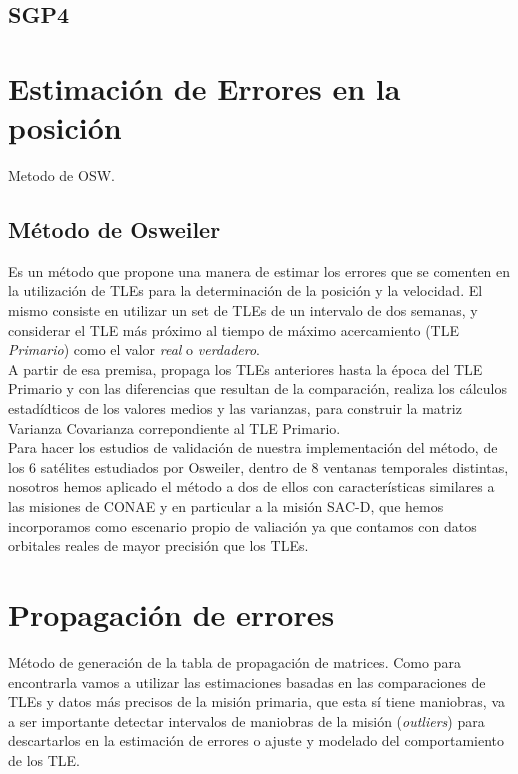 \subsection*{SGP4}{\label{subsec:sgp4model}}

\section{Estimaci\'on de Errores en la posici\'on}
Metodo de OSW.
\subsection{M\'etodo de Osweiler}
Es un m\'etodo que propone una manera de estimar los errores que se comenten en la utilizaci\'on de TLEs para la determinaci\'on de la posici\'on y la velocidad.
 El mismo consiste en utilizar un set de TLEs de un intervalo de dos semanas, y considerar el TLE m\'as pr\'oximo al tiempo de m\'aximo acercamiento (TLE  {\it{Primario}}) como el valor {\it{real}} o {\it{verdadero}}.\\
 A partir de esa premisa, propaga los TLEs anteriores hasta la \'epoca del TLE Primario y con las diferencias que resultan de la comparaci\'on, realiza los c\'alculos estad\'idticos de los valores medios y las varianzas, para construir la matriz Varianza Covarianza correpondiente al TLE Primario.\\
 Para hacer los estudios de validaci\'on de nuestra implementaci\'on del m\'etodo, de los 6 sat\'elites estudiados por Osweiler, dentro de 8 ventanas temporales distintas, nosotros hemos aplicado el m\'etodo a dos de ellos con caracter\'isticas similares a las misiones de CONAE y en particular a la misi\'on SAC-D, que hemos incorporamos como escenario propio de valiaci\'on ya que contamos con datos orbitales reales de mayor precisi\'on que los TLEs.

 \section{Propagaci\'on de errores}\label{sec:properrores}
 M\'etodo de generaci\'on de la tabla de propagaci\'on de matrices. 
 Como para encontrarla vamos a utilizar las estimaciones basadas en las comparaciones de TLEs y datos m\'as precisos de la misi\'on primaria, que esta s\'i tiene maniobras, va a ser importante detectar intervalos de maniobras de la misión ({\it{outliers}}) para descartarlos en la estimaci\'on de errores o ajuste y modelado del comportamiento de los TLE.\\

